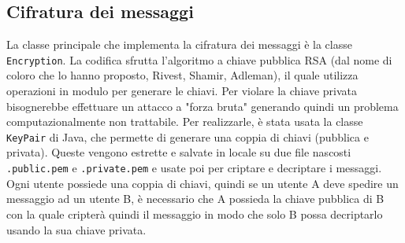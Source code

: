 \subsection{Cifratura dei messaggi}
La classe principale che implementa la cifratura dei messaggi è la classe \texttt{Encryption}.
La codifica sfrutta l'algoritmo a chiave pubblica RSA (dal nome di coloro che
lo hanno proposto, Rivest, Shamir, Adleman), il quale utilizza operazioni in modulo per generare
le chiavi. Per violare la chiave privata bisognerebbe effettuare un attacco a "forza bruta"
generando quindi un problema computazionalmente non trattabile. Per realizzarle, è stata usata
la classe \texttt{KeyPair} di Java, che permette di generare una coppia di chiavi (pubblica e privata).
Queste vengono estrette e salvate in locale su due file nascosti \texttt{.public.pem} e
\texttt{.private.pem} e usate poi per criptare e decriptare i messaggi.
Ogni utente possiede una coppia di chiavi, quindi se un utente A deve spedire un messaggio
ad un utente B, è necessario che A possieda la chiave pubblica di B con la quale cripterà quindi il
messaggio in modo che solo B possa decriptarlo usando la sua chiave privata.